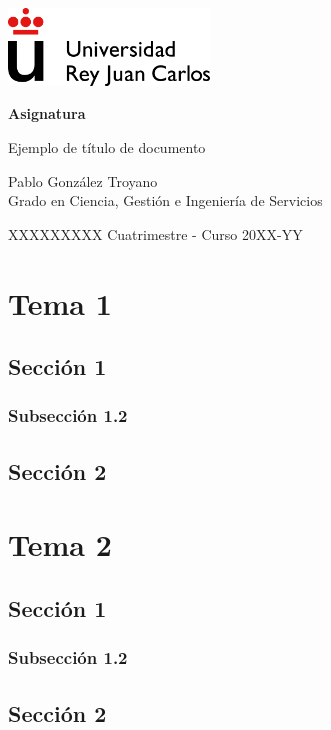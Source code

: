 \documentclass[10pt, a4paper]{book}
\newcommand\asignatura{Asignatura}
\newcommand\DocumentTitle{Ejemplo de título de documento}
\newcommand\mesyanno{XXXXXXXXX Cuatrimestre - Curso 20XX-YY}
\newcommand\autor{Pablo González Troyano}
\newcommand\grado{Grado en Ciencia, Gestión e Ingeniería de Servicios}
\begin{document}
\begin{titlepage}
\includegraphics[width=0.4\textwidth]{URJC_logo.png}
    \begin{center}
        \vspace*{7cm}  
        \Huge
        \textbf{\asignatura}
        
        \vspace{1cm}
        
        \huge{\DocumentTitle}
        \vspace{1.5cm}
        \Large
        \vfill    
        \vspace{1cm}
        \Large
    \end{center}
    {\parindent0pt \autor \\ \grado }
    \begin{flushright}
        \mesyanno
    \end{flushright}
\end{titlepage}


\setcounter{tocdepth}{4}
\let\cleardoublepage\clearpage
\tableofcontents\newpage


\chapter{Tema 1}
    \lipsum[1-5]
    \section{Sección 1}
        \lipsum[1-5]
    \subsection{Subsección 1.2}
        \lipsum[1-5]
    \section{Sección 2}
        \lipsum[1-5]

\chapter{Tema 2}
    \lipsum[1-5]
    \section{Sección 1}
        \lipsum[1-5]
    \subsection{Subsección 1.2}
        \lipsum[1-5]
    \section{Sección 2}
        \lipsum[1-5]

\end{document}
